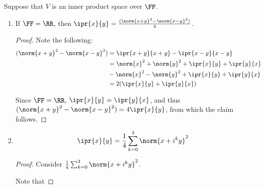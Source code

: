 \documentclass[11pt]{scrartcl}
\begin{document}
Suppose that $V$ is an inner product space over $\FF$.

\begin{enumerate}[label=\alph*)]
\item
  \begin{claim*}
    If $\FF = \RR$, then
    $\ipr{x}{y} = \frac{(\norm{x+y}^2 - \norm{x-y}^2)}{4}$.
  \end{claim*}
  \begin{proof}
    Note the following:
    \begin{align}
      (\norm{x+y}^2 - \norm{x-y}^2) & = \ipr{x+y}{x+y}-\ipr{x-y}{x-y}                     \\
                                    & = \norm{x}^2 + \norm{y}^2 + \ipr{x}{y} + \ipr{y}{x} \\
                                    & - \norm{x}^2 - \norm{y}^2 + \ipr{x}{y} + \ipr{y}{x} \\
                                    & = 2(\ipr{x}{y} + \ipr{y}{x})
    \end{align}

    Since $\FF = \RR$, $\ipr{x}{y} = \ipr{y}{x}$, and thus
    $ (\norm{x+y}^2 - \norm{x-y}^2) = 4 \ipr{x}{y}$, from which the claim follows.
  \end{proof}
\item

  \begin{claim*}
    
    \begin{equation*}
      \ipr{x}{y} = \frac{1}{4} \sum_{k=0}^3\norm{x+i^ky}^2
    \end{equation*}
  \end{claim*}
  \begin{proof}
    \hfill

    Consider $\frac{1}{4} \sum_{k=0}^3\norm{x+i^ky}^2$.

    Note that


\end{proof}
\end{enumerate}
\end{document}

